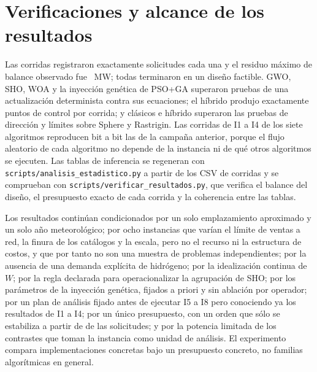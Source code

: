 \section{Verificaciones y alcance de los resultados}
\label{sec:verificaciones}

Las \TotalRuns{} corridas registraron exactamente \RequestsPerRun{} solicitudes cada una y el residuo máximo de balance observado fue \MaxBalanceResidual~MW; todas terminaron en un diseño factible. GWO, SHO, WOA y la inyección genética de PSO+GA superaron pruebas de una actualización determinista contra sus ecuaciones; el híbrido produjo exactamente \Iterations{} puntos de control por corrida; y clásicos e híbrido superaron las pruebas de dirección y límites sobre Sphere y Rastrigin. Las corridas de I1 a I4 de los siete algoritmos reproducen bit a bit las de la campaña anterior, porque el flujo aleatorio de cada algoritmo no depende de la instancia ni de qué otros algoritmos se ejecuten. Las tablas de inferencia se regeneran con \texttt{scripts/analisis\_estadistico.py} a partir de los CSV de corridas y se comprueban con \texttt{scripts/verificar\_resultados.py}, que verifica el balance del diseño, el presupuesto exacto de cada corrida y la coherencia entre las tablas.

Los resultados continúan condicionados por un solo emplazamiento aproximado y un solo año meteorológico; por ocho instancias que varían el límite de ventas a red, la finura de los catálogos y la escala, pero no el recurso ni la estructura de costos, y que por tanto no son una muestra de problemas independientes; por la ausencia de una demanda explícita de hidrógeno; por la idealización continua de $W$; por la regla declarada para operacionalizar la agrupación de SHO; por los parámetros de la inyección genética, fijados a priori y sin ablación por operador; por un plan de análisis fijado antes de ejecutar I5 a I8 pero conociendo ya los resultados de I1 a I4; por un único presupuesto, con un orden que sólo se estabiliza a partir de \ConvSettleFrom{} de las \RequestsPerRun{} solicitudes; y por la potencia limitada de los contrastes que toman la instancia como unidad de análisis. El experimento compara implementaciones concretas bajo un presupuesto concreto, no familias algorítmicas en general.
